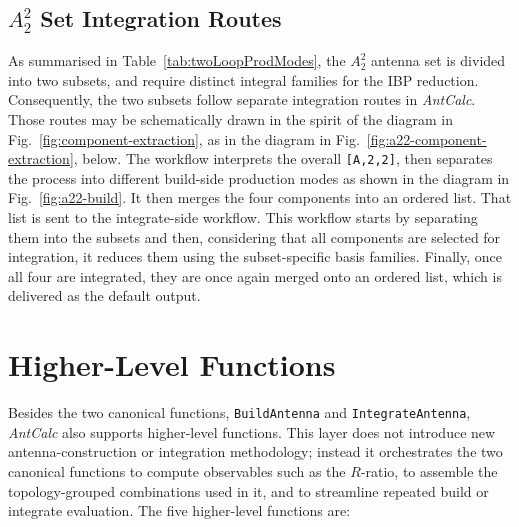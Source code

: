 \subsection{$A_2^2$ Set Integration Routes}

As summarised in Table~\ref{tab:twoLoopProdModes}, the $A_2^2$ antenna set is divided into two
subsets, and require distinct integral families for the IBP reduction. Consequently, the two
subsets follow separate integration routes in \textit{AntCalc}.
Those routes may be schematically drawn in the spirit of the diagram in
Fig.~\ref{fig:component-extraction}, as in the diagram in 
Fig.~\ref{fig:a22-component-extraction}, below. The workflow interprets the overall 
\texttt{[A,2,2]}, then separates the process into different build-side production modes 
as shown in the diagram in Fig.~\ref{fig:a22-build}. It then merges the four components into 
an ordered list. That list is sent to the integrate-side workflow. This workflow starts by 
separating them into the subsets and then, considering that all components are selected for 
integration, it reduces them using the subset-specific basis families. Finally, once all four 
are integrated, they are once again merged onto an ordered list, which is delivered as the 
default output.



\fi

\section{Higher-Level Functions}

Besides the two canonical functions, \texttt{BuildAntenna} and \texttt{IntegrateAntenna},
\textit{AntCalc} also supports higher-level functions. This layer does not
introduce new antenna-construction or integration methodology; instead it orchestrates the
two canonical functions to compute observables such as the $R$-ratio, to assemble the
topology-grouped combinations used in it, and to streamline repeated build or integrate
evaluation. The five higher-level functions are:

